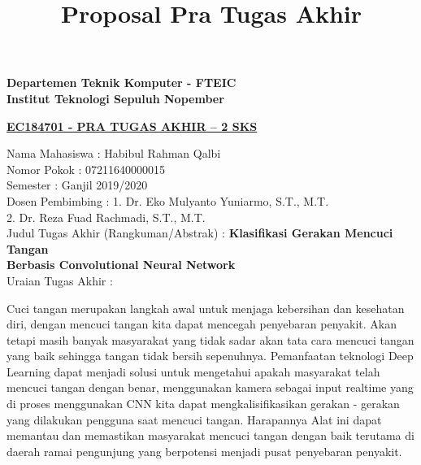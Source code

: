 \documentclass[a4paper]{article}
\title{Proposal Pra Tugas Akhir}
\begin{document}
	
	\begin{flushleft}
		\textbf{Departemen Teknik Komputer - FTEIC}\\
		\textbf{Institut Teknologi Sepuluh Nopember}\\
	\end{flushleft}

	\begin{center}
		\underline{\textbf{EC184701 - PRA TUGAS AKHIR – 2 SKS}}
	\end{center}

	\begin{flushleft}
		Nama Mahasiswa \tab : Habibul Rahman Qalbi\\
		Nomor Pokok \tab : 07211640000015 \\
		Semester \tab : Ganjil 2019/2020\\
		Dosen Pembimbing \tab : 1. Dr. Eko Mulyanto Yuniarmo, S.T., M.T.\\
		\tab \hspace{1mm} 2. Dr. Reza Fuad Rachmadi, S.T., M.T.\\
		Judul Tugas Akhir (Rangkuman/Abstrak) \tab : \textbf{Klasifikasi Gerakan Mencuci Tangan\\
		\tab \hspace{1mm} Berbasis Convolutional Neural Network}\\
		Uraian Tugas Akhir \tab :\\
	\end{flushleft}
		\vspace{-3mm}Cuci tangan merupakan langkah awal untuk menjaga kebersihan dan kesehatan diri, dengan mencuci tangan kita dapat mencegah penyebaran penyakit. Akan tetapi masih banyak masyarakat yang tidak sadar akan tata cara mencuci tangan yang baik sehingga tangan tidak bersih sepenuhnya. Pemanfaatan teknologi Deep Learning dapat menjadi solusi untuk mengetahui apakah masyarakat telah mencuci tangan dengan benar, menggunakan kamera sebagai input realtime yang di proses menggunakan CNN kita dapat mengkalisifikasikan gerakan - gerakan yang dilakukan pengguna saat mencuci tangan. Harapannya Alat ini dapat memantau dan memastikan masyarakat mencuci tangan dengan baik terutama di daerah ramai pengunjung yang berpotensi menjadi pusat penyebaran penyakit.
	\vspace{1cm}
	
\end{document}
